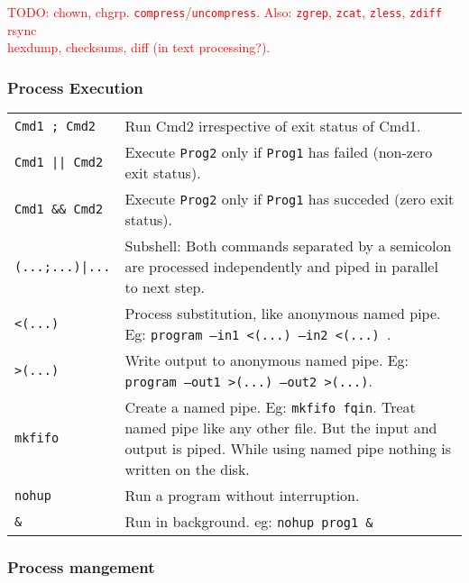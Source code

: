 \textcolor{red}{TODO: chown, chgrp.}
\textcolor{red}{\texttt{compress}/\texttt{uncompress}. Also: \texttt{zgrep}, \texttt{zcat}, \texttt{zless}, \texttt{zdiff}}
\textcolor{red}{rsync}\\
\textcolor{red}{hexdump, checksums, diff (in text processing?).}\\

\subsubsection{Process Execution}

\begin{tabularx}{\linewidth}{lX}

    \texttt{Cmd1 ; Cmd2}        & Run Cmd2 irrespective of exit status of Cmd1.\\
    \texttt{Cmd1 || Cmd2}       & Execute \texttt{Prog2} only if \texttt{Prog1} has failed (non-zero exit status).\\
    \texttt{Cmd1 \&\& Cmd2}     & Execute \texttt{Prog2} only if \texttt{Prog1} has succeded (zero exit status).\\
    \texttt{(...;...)|...}      & Subshell: Both commands separated by a semicolon are processed independently and piped in parallel to next step. \\
    \texttt{<(...)}             & Process substitution, like anonymous named pipe. Eg: \texttt{program --in1 <(...) --in2 <(...) }.\\
    \texttt{>(...)}             & Write output to anonymous named pipe. Eg: \texttt{program --out1 >(...) --out2 >(...)}.\\
    \hline

    \texttt{mkfifo}             & Create a named pipe. Eg: \texttt{mkfifo fqin}. Treat named pipe like any other file. But the input and output is piped. While using named pipe nothing is written on the disk.\\

    \texttt{nohup} & Run a program without interruption.\\
    \texttt{\&} & Run in background. eg: \texttt{nohup prog1 \&}\\
    \hline

\end{tabularx}


\subsubsection{Process mangement}

